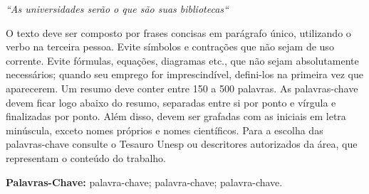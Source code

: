 	
	
	\begin{epigrafe}
		\vspace*{\fill}
		\begin{flushright}
			\textit{
				``As universidades serão o que são suas bibliotecas``\\ 
				\cite[~ p. 19, tradução nossa]{Gelfand}
			}
		\end{flushright}
	\end{epigrafe}
	
	
	\begin{resumo}
		
		O texto deve ser composto por frases concisas em parágrafo único, utilizando o verbo na terceira pessoa. Evite símbolos e contrações que não sejam de uso corrente. Evite fórmulas, equações, diagramas etc., que não sejam absolutamente necessários; quando seu emprego for imprescindível, defini-los na primeira vez que aparecerem. Um resumo deve conter entre 150 a 500 palavras. As palavras-chave devem ficar logo abaixo do resumo, separadas entre si por ponto e vírgula e finalizadas por ponto. Além disso, devem ser grafadas com as iniciais em letra minúscula, exceto nomes próprios e nomes científicos. Para a escolha das palavras-chave consulte o Tesauro Unesp ou descritores autorizados da área, que representam o conteúdo do trabalho.
		
		\vspace*{0.5cm}
		
		\noindent\textbf{{Palavras-Chave: }} palavra-chave; palavra-chave; palavra-chave.
		
	\end{resumo}
	
